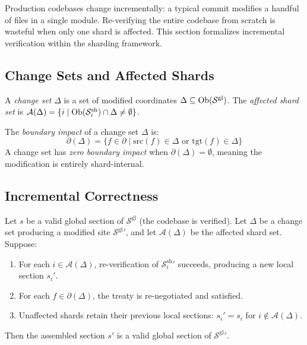 \documentclass[11pt]{article}
\newcommand{\ShardSite}{\mathcal{S}^{\mathrm{sh}}}
\newcommand{\GlobalSite}{\mathcal{S}^{\mathrm{gl}}}
\begin{document}
Production codebases change incrementally: a typical commit modifies
a handful of files in a single module.  Re-verifying the entire
codebase from scratch is wasteful when only one shard is affected.
This section formalizes incremental verification within the
sharding framework.

\subsection{Change Sets and Affected Shards}

\begin{definition}\label{def:change-set}
A \emph{change set} $\Delta$ is a set of modified coordinates
$\Delta \subseteq \Ob(\GlobalSite)$.  The \emph{affected shard set}
is $\mathcal{A}(\Delta) = \{i \mid \Ob(\ShardSite_i) \cap \Delta
\neq \emptyset\}$.
\end{definition}

\begin{definition}\label{def:boundary-impact}
The \emph{boundary impact} of a change set $\Delta$ is:
\[
  \partial(\Delta) = \{f \in \partial \mid \mathrm{src}(f) \in \Delta
  \text{ or } \mathrm{tgt}(f) \in \Delta\}
\]
A change set has \emph{zero boundary impact} when
$\partial(\Delta) = \emptyset$, meaning the modification is
entirely shard-internal.
\end{definition}

\subsection{Incremental Correctness}

\begin{theorem}
\label{thm:incremental}
Let $s$ be a valid global section of $\GlobalSite$ (\ie the
codebase is verified).  Let $\Delta$ be a change set producing
a modified site $\GlobalSite'$, and let $\mathcal{A}(\Delta)$
be the affected shard set.  Suppose:
\begin{enumerate}[noitemsep]
  \item For each $i \in \mathcal{A}(\Delta)$, re-verification
        of $\ShardSite_i'$ succeeds, producing a new local section
        $s_i'$.
  \item For each $f \in \partial(\Delta)$, the treaty is
        re-negotiated and satisfied.
  \item Unaffected shards retain their previous local sections:
        $s_i' = s_i$ for $i \notin \mathcal{A}(\Delta)$.
\end{enumerate}
Then the assembled section $s'$ is a valid global section of
$\GlobalSite'$.
\end{theorem}
\end{document}
